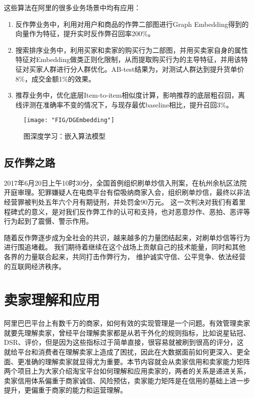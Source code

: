 这些算法在阿里的很多业务场景中均有应用：
\begin{enumerate}
	\item 反作弊业务中，利用对用户和商品的作弊二部图进行Graph Embedding得到的向量作为特征，提升实时反作弊召回率200\%。
	\item 搜索排序业务中，利用买家和卖家的购买行为二部图，并用买卖家自身的属性特征对Embedding做类正则化限制，从而提取购买行为的主导特征，并用该特征对买家人群进行分人群优化。AB-test结果为，对测试人群达到提升货单价8\%，成交金额1\%的效果。\
	\item 推荐业务中，优化底层Item-to-item相似度计算，影响推荐的底层粗召回，离线评测在准确率不变的情况下，与现存最优baseline相比，提升召回3\%。
\end{enumerate}

\begin{figure}[H]
	\centering
	\texttt{[image: "FIG/DGEmbedding"]}
	\caption{图深度学习：嵌入算法模型}
	\label{fig:DGEmbedding}
\end{figure}

\subsection*{反作弊之路}

2017年6月20日上午10时30分，全国首例组织刷单炒信入刑案，在杭州余杭区法院开庭审理。犯罪嫌疑人在电商平台有偿吸纳商家入会，组织刷单炒信，最终以非法经营罪被判处五年六个月有期徒刑，并处罚金90万元。
这一次判决对我们有着里程碑式的意义，是对我们反作弊工作的认可和支持，也对恶意炒作、恶拍、恶评等行为起到了震慑、警示作用。

随着反作弊逐步成为全社会的共识，越来越多的力量团结起来，对刷单炒信等行为进行围追堵截。
我们期待着继续在这个战场上贡献自己的技术能量，同时和其他各界的力量联合起来，共同打击作弊行为，
维护诚实守信、公平竞争、依法经营的互联网经济秩序。



\section{卖家理解和应用}
阿里巴巴平台上有数千万的商家，如何有效的实现管理是一个问题。有效管理卖家就要先理解卖家，曾经平台理解卖家都是从若干外化的规则指标，比如说星钻冠、DSR、评价，但是因为这些指标过于简单直接，很容易就被刷到很高的评分，这就给平台和消费者在理解卖家上造成了困扰，因此在大数据面前如何更深入、更全面、更准确的理解卖家就显得尤为重要。本节内容就会从卖家信用和卖家能力矩阵两个项目上为大家介绍淘宝平台如何理解和应用卖家的，两者的关系是递进关系，卖家信用体系偏重于商家诚信、风险预估，卖家能力矩阵是在信用的基础上进一步提升，更偏重于商家的能力和运营理解。

